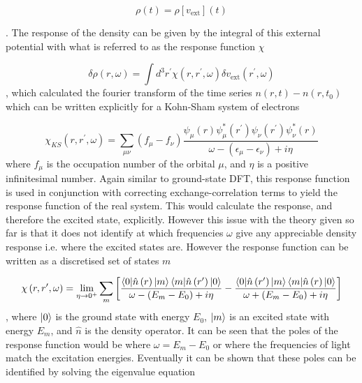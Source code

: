 \begin{equation}
\rho\left(t\right) = \rho\left[v_{\text{ext}}\right]\left(t\right)
\end{equation}

. The response of the density can be given by the integral of this external potential
with what is referred to as the response function $\chi$

\begin{equation}
    \delta \rho \left(r, \omega \right) = \int d^3 r^\prime \chi \left(r, r^\prime, \omega \right) \delta v_{\text{ext}} \left(r^\prime, \omega \right)
\end{equation}
%
, which calculated the fourier transform of the time series $n\left(r, t\right) - n\left(r, t_0\right)$
which can be written explicitly for a Kohn-Sham system of electrons

\begin{equation}
    \chi_{KS} \left(r, r^\prime, \omega \right) = \sum_{\mu\nu} \left(f_\mu - f_\nu \right) \frac{\psi_\mu\left(r\right)\psi^\ast_\mu\left(r^\prime\right) \psi_\nu\left(r^\prime\right) \psi^\ast_\nu\left(r\right)}{\omega - \left(\epsilon_\mu - \epsilon_\nu\right) + i\eta}
\end{equation}
%
where $f_\mu$ is the occupation number of the orbital $\mu$, and $\eta$ is a positive
infinitesimal number. Again similar to ground-state DFT, this response function 
is used in conjunction with correcting exchange-correlation terms to yield the response
function of the real system. This would calculate the response, and therefore the 
excited state, explicitly. However this issue with the theory given so far is that
it does not identify at which frequencies $\omega$ give any appreciable density 
response i.e. where the excited states are. However the response function can be
written as a discretised set of states $m$

\begin{equation}
    \chi\left(r, r^\prime, \omega \right) = \lim_{\eta \to 0^+} \sum_m \left[ \frac{\braket{0|\hat{n}\left(r\right)|m}\braket{m|\hat{n}\left(r^\prime\right)|0}}{\omega - \left(E_m - E_0\right) + i\eta} - \frac{\braket{0|\hat{n}\left(r^\prime\right)|m}\braket{m|\hat{n}\left(r\right)|0}}{\omega + \left(E_m - E_0\right) + i\eta} \right]
\end{equation}
%
, where $\ket{0}$ is the ground state with energy $E_0$, $\ket{m}$ is an excited
state with energy $E_m$, and $\hat{n}$ is the density operator. It can be seen that
the poles of the response function would be where $\omega = E_m - E_0$ or where 
the frequencies of light match the excitation energies. Eventually it can be shown 
that these poles can be identified by solving the eigenvalue equation


